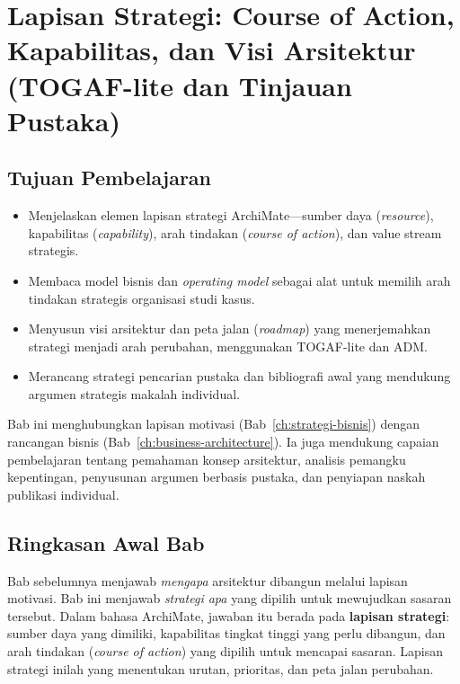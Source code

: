 \chapter[Lapisan Strategi: Course of Action, Kapabilitas, dan Visi Arsitektur]{Lapisan
Strategi: Course of Action, Kapabilitas, dan Visi Arsitektur (TOGAF-lite dan
Tinjauan Pustaka)}
\label{ch:togaf-lite}
\setlength{\emergencystretch}{2em}

\section*{Tujuan Pembelajaran}
\begin{itemize}
  \item Menjelaskan elemen lapisan strategi ArchiMate---sumber daya
        (\emph{resource}), kapabilitas (\emph{capability}), arah tindakan
        (\emph{course of action}), dan value stream strategis.
  \item Membaca model bisnis dan \emph{operating model} sebagai alat untuk
        memilih arah tindakan strategis organisasi studi kasus.
  \item Menyusun visi arsitektur dan peta jalan (\emph{roadmap}) yang
        menerjemahkan strategi menjadi arah perubahan, menggunakan TOGAF-lite
        dan ADM.
  \item Merancang strategi pencarian pustaka dan bibliografi awal yang
        mendukung argumen strategis makalah individual.
\end{itemize}

Bab ini menghubungkan lapisan motivasi (Bab~\ref{ch:strategi-bisnis}) dengan
rancangan bisnis (Bab~\ref{ch:business-architecture}). Ia juga mendukung
capaian pembelajaran tentang pemahaman konsep arsitektur, analisis pemangku
kepentingan, penyusunan argumen berbasis pustaka, dan penyiapan naskah
publikasi individual.

\section{Ringkasan Awal Bab}

Bab sebelumnya menjawab \emph{mengapa} arsitektur dibangun melalui lapisan
motivasi. Bab ini menjawab \emph{strategi apa} yang dipilih untuk mewujudkan
sasaran tersebut. Dalam bahasa ArchiMate, jawaban itu berada pada
\textbf{lapisan strategi}: sumber daya yang dimiliki, kapabilitas tingkat
tinggi yang perlu dibangun, dan arah tindakan (\emph{course of action}) yang
dipilih untuk mencapai sasaran. Lapisan strategi inilah yang menentukan urutan,
prioritas, dan peta jalan perubahan.

